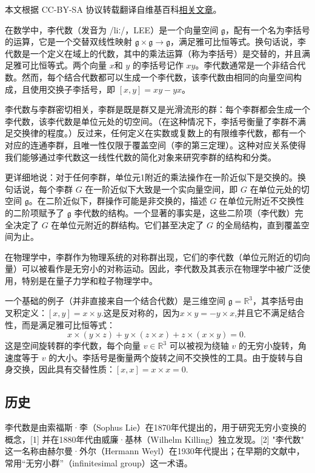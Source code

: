 
本文根据 CC-BY-SA 协议转载翻译自维基百科\href{https://en.wikipedia.org/wiki/Lie_algebra}{相关文章}。

在数学中，李代数（发音为 /liː/，LEE）是一个向量空间 \( \mathfrak{g} \)，配有一个名为李括号的运算，它是一个交替双线性映射 \(\mathfrak{g}\times \mathfrak{g}\to \mathfrak{g}\)，满足雅可比恒等式。换句话说，李代数是一个定义在域上的代数，其中的乘法运算（称为李括号）是交替的，并且满足雅可比恒等式。两个向量 \(x\)和 \(y\) 的李括号记作 \(xy\)。李代数通常是一个非结合代数。然而，每个结合代数都可以生成一个李代数，该李代数由相同的向量空间构成，且使用交换子李括号，即 \([x,y]=xy-yx\)。

李代数与李群密切相关，李群是既是群又是光滑流形的群：每个李群都会生成一个李代数，该李代数是单位元处的切空间。（在这种情况下，李括号衡量了李群不满足交换律的程度。）反过来，任何定义在实数或复数上的有限维李代数，都有一个对应的连通李群，且唯一性仅限于覆盖空间（李的第三定理）。这种对应关系使得我们能够通过李代数这一线性代数的简化对象来研究李群的结构和分类。

更详细地说：对于任何李群，单位元1附近的乘法操作在一阶近似下是交换的。换句话说，每个李群 \( G \) 在一阶近似下大致是一个实向量空间，即 \( G \) 在单位元处的切空间 \( \mathfrak{g} \)。在二阶近似下，群操作可能是非交换的，描述 \( G \) 在单位元附近不交换性的二阶项赋予了 \( \mathfrak{g} \) 李代数的结构。一个显著的事实是，这些二阶项（李代数）完全决定了 \( G \) 在单位元附近的群结构。它们甚至决定了 \( G \) 的全局结构，直到覆盖空间为止。

在物理学中，李群作为物理系统的对称群出现，它们的李代数（单位元附近的切向量）可以被看作是无穷小的对称运动。因此，李代数及其表示在物理学中被广泛使用，特别是在量子力学和粒子物理学中。

一个基础的例子（并非直接来自一个结合代数）是三维空间 \(\mathfrak{g} = \mathbb{R}^3\)，其李括号由叉积定义：\([x, y] = x \times y.\)这是反对称的，因为\(x \times y = -y \times x\),并且它不满足结合性，而是满足雅可比恒等式：
\[x \times (y \times z) + y \times (z \times x) + z \times (x \times y) = 0.~\]
这是空间旋转群的李代数，每个向量 \(v \in \mathbb{R}^3\) 可以被视为绕轴 \(v\) 的无穷小旋转，角速度等于 \(v\) 的大小。李括号是衡量两个旋转之间不交换性的工具。由于旋转与自身交换，因此具有交替性质：\([x, x] = x \times x = 0\).
\subsection{历史}  
李代数是由索福斯·李（Sophus Lie）在1870年代提出的，用于研究无穷小变换的概念，[1] 并在1880年代由威廉·基林（Wilhelm Killing）独立发现。[2] "李代数" 这一名称由赫尔曼·外尔（Hermann Weyl）在1930年代提出；在早期的文献中，常用“无穷小群”（infinitesimal group）这一术语。
